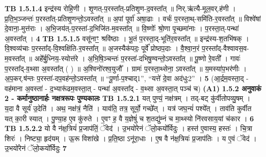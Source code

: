 \documentclass[17pt]{extarticle}
\begin{document}
                  \newline
                                \textbf{ TB 1.5.1.4} \newline
                  इन्द्र॑स्य रोहि॒णी । शृ॒णत्-प॒रस्ता᳚त्-प्रतिशृ॒ण-द॒वस्ता᳚त् ॥ निर्.ऋ॑त्यै-मूल॒वर्.ह॑णी । प्र॒ति॒भ॒ञ्जन्तः॑ प॒रस्ता᳚त्-प्रतिशृ॒णन्तो॒ऽवस्ता᳚त् ॥ अ॒पां पूर्वा॑ अषा॒ढाः । वर्चः॑ प॒रस्ता॒थ्-समि॑ति-र॒वस्ता᳚त् ॥ विश्वे॑षां दे॒वाना॒-मुत्त॑राः । अ॒भि॒जय॑त्-प॒रस्ता॑-द॒भिजि॑त-म॒वस्ता᳚त् ॥ वि॒ष्णोः᳚ श्रो॒णा पृ॒च्छमा॑नाः । प॒रस्ता॒त्-पन्था॑ अ॒वस्ता᳚त् । \textbf{ 4} \newline
                  \newline
                                \textbf{ TB 1.5.1.5} \newline
                  वसू॑नाꣳ॒॒ श्रवि॑ष्ठाः । भू॒तं प॒रस्ता॒द्-भूति॑र॒वस्ता᳚त् ॥ इन्द्र॑स्य-श॒तभि॑षक् । वि॒श्वव्य॑चाः प॒रस्ता᳚द्-वि॒श्वक्षि॑ति-र॒वस्ता᳚त् ॥ अ॒जस्यैक॑पदः॒ पूर्वे᳚ प्रोष्ठप॒दाः । वै॒श्वा॒न॒रं प॒रस्ता᳚द्-वैश्वावस॒व-म॒वस्ता᳚त् ॥ अहे᳚र्बु॒ध्निय॒-स्योत्त॑रे । अ॒भि॒षि॒ञ्चन्तः॑ प॒रस्ता॑-दभिषु॒ण्वन्तो॒ऽवस्ता᳚त् ॥ पू॒ष्णो रे॒वती᳚ । गावः॑ प॒रस्ता᳚द्-व॒थ्सा अ॒वस्ता᳚त् ( ) ॥ अ॒श्विनो॑रश्व॒युजौ᳚ । ग्रामः॑ प॒रस्ता॒थ्सेना॒ ऽवस्ता᳚त् ॥ य॒मस्या॑प॒भर॑णीः । अ॒प॒कर्.ष॑न्तः प॒रस्ता॑-दप॒वह॑न्तो॒ऽवस्ता᳚त् ॥ “पू॒र्णा-प॒श्चाद्{1}”, “यत्ते॑ दे॒वा अद॑धुः{2}” । \textbf{ 5} \newline
                  \newline
                                    (आ॒र्द्रम॒वस्ता॒द् - वह॑माना अ॒वस्ता॑ - द॒भ्यारू॑ढम॒वस्ता॒त् - पन्था॑ अ॒वस्ता᳚द् - व॒थ्सा अ॒वस्ता॒त् पञ्च॑ च) \textbf{(A1)} \newline \newline
                \textbf{ 1.5.2     अनुवाकं   2 - कर्मानुष्ठानार्हः नक्षत्ररूपः पुण्यकालः} \newline
                                \textbf{ TB 1.5.2.1} \newline
                  यत् पुण्यं॒ नक्ष॑त्रम् । तद्-बट् कु॑र्वीतोपव्यु॒षम् । य॒दा वै सूर्य॑ उ॒देति॑ । अथ॒ नक्ष॑त्रं॒ नैति॑ । याव॑ति॒ तत्र॒ सूर्यो॒ गच्छे᳚त् । यत्र॑ जघ॒न्यं॑ पश्ये᳚त् । ताव॑ति कुर्वीत यत् का॒री स्यात् । पु॒ण्या॒ह ए॒व कु॑रुते । ए॒वꣳ ह॒ वै य॒ज्ञेषुं॑ च श॒तद्यु॑म्नं च मा॒थ्स्यो नि॑रवसाय॒यां च॑कार । \textbf{ 6} \newline
                  \newline
                                \textbf{ TB 1.5.2.2} \newline
                  यो वै न॑क्ष॒त्रियं॑ प्र॒जाप॑तिं॒ ॅवेद॑ । उ॒भयो॑रेनं ॅलो॒कयो᳚र्विदुः । हस्त॑ ए॒वास्य॒ हस्तः॑ । चि॒त्रा शिरः॑ । निष्ट्या॒ हृद॑यम् । ऊ॒रू विशा॑खे । प्र॒ति॒ष्ठा ऽनू॑रा॒धाः । ए॒ष वै न॑क्ष॒त्रियः॑ प्र॒जाप॑तिः । य ए॒वं ॅवेद॑ । उ॒भयो॑रेनं ॅलो॒कयो᳚र्विदुः \textbf{ 7} \newline
\end{document}
